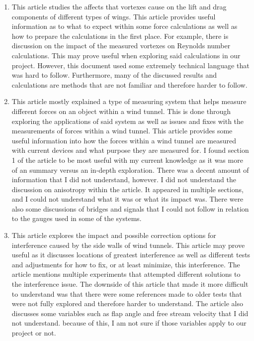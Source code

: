 \documentclass[12pt,letterpaper]{article}
\begin{document}
\begin{enumerate}
	\item \cite{Gerontakos2007} This article studies the affects that vortexes cause on the lift and drag components of different types of wings. This article provides useful information as to what to expect within some force calculations as well as how to prepare the calculations in the first place. For example, there is discussion on the impact of the measured vortexes on Reynolds number calculations. This may prove useful when exploring said calculations in our project. However, this document used some extremely technical language that was hard to follow. Furthermore, many of the discussed results and calculations are methods that are not familiar and therefore harder to follow.
	\item \cite{Portman2009} This article mostly explained a type of measuring system that helps measure different forces on an object within a wind tunnel. This is done through exploring the applications of said system as well as issues and fixes with the measurements of forces within a wind tunnel. This article provides some useful information into how the forces within a wind tunnel are measured with current devices and what purpose they are measured for. I found section 1 of the article to be most useful with my current knowledge as it was more of an summary versus an in-depth exploration. There was a decent amount of information that I did not understand, however. I did not understand the discussion on anisotropy within the article. It appeared in multiple sections, and I could not understand what it was or what its impact was. There were also some discussions of bridges and signals that I could not follow in relation to the gauges used in some of the systems.
	\item \cite{Motohashi1983} This article explores the impact and possible correction options for interference caused by the side walls of wind tunnels. This article may prove useful as it discusses locations of greatest interference as well as different tests and adjustments for how to fix, or at least minimize, this interference. The article mentions multiple experiments that attempted different solutions to the interference issue. The downside of this article that made it more difficult to understand was that there were some references made to older tests that were not fully explored and therefore harder to understand. The article also discusses some variables such as flap angle and free stream velocity that I did not understand. because of this, I am not sure if those variables apply to our project or not.

\end{enumerate}
\end{document}
